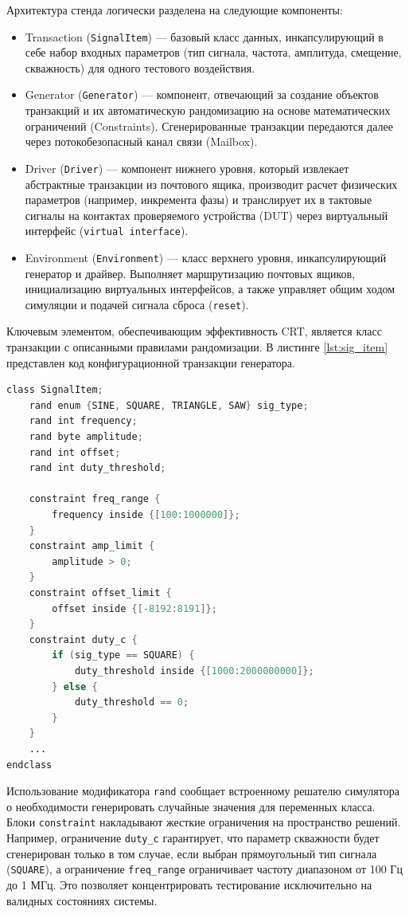 \documentclass[12pt,a4paper,TimesNewRoman]{article}
\begin{document}
Архитектура стенда логически разделена на следующие компоненты:
\begin{itemize}
    \item Transaction (\texttt{SignalItem}) — базовый класс данных, инкапсулирующий в себе набор входных параметров (тип сигнала, частота, амплитуда, смещение, скважность) для одного тестового воздействия.
    \item Generator (\texttt{Generator}) — компонент, отвечающий за создание объектов транзакций и их автоматическую рандомизацию на основе математических ограничений (Constraints). Сгенерированные транзакции передаются далее через потокобезопасный канал связи (Mailbox).
    \item Driver (\texttt{Driver}) — компонент нижнего уровня, который извлекает абстрактные транзакции из почтового ящика, производит расчет физических параметров (например, инкремента фазы) и транслирует их в тактовые сигналы на контактах проверяемого устройства (DUT) через виртуальный интерфейс (\texttt{virtual interface}).
    \item Environment (\texttt{Environment}) — класс верхнего уровня, инкапсулирующий генератор и драйвер. Выполняет маршрутизацию почтовых ящиков, инициализацию виртуальных интерфейсов, а также управляет общим ходом симуляции и подачей сигнала сброса (\texttt{reset}).
\end{itemize}

Ключевым элементом, обеспечивающим эффективность CRT, является класс транзакции с описанными правилами рандомизации. В листинге \ref{lst:sig_item} представлен код конфигурационной транзакции генератора.

\begin{lstlisting}[language=Verilog, caption={Класс транзакции с ограничениями рандомизации}, label={lst:sig_item}]
class SignalItem;
    rand enum {SINE, SQUARE, TRIANGLE, SAW} sig_type;
    rand int frequency;
    rand byte amplitude;
    rand int offset;
    rand int duty_threshold;

    constraint freq_range {
        frequency inside {[100:1000000]};
    }
    constraint amp_limit {
        amplitude > 0;
    }
    constraint offset_limit {
        offset inside {[-8192:8191]};
    }
    constraint duty_c {
        if (sig_type == SQUARE) {
            duty_threshold inside {[1000:2000000000]};
        } else {
            duty_threshold == 0;
        } 
    }
    ...
endclass
\end{lstlisting}

Использование модификатора \texttt{rand} сообщает встроенному решателю симулятора о необходимости генерировать случайные значения для переменных класса. Блоки \texttt{constraint} накладывают жесткие ограничения на пространство решений. Например, ограничение \texttt{duty\_c} гарантирует, что параметр скважности будет сгенерирован только в том случае, если выбран прямоугольный тип сигнала (\texttt{SQUARE}), а ограничение \texttt{freq\_range} ограничивает частоту диапазоном от 100 Гц до 1 МГц. Это позволяет концентрировать тестирование исключительно на валидных состояниях системы.
\end{document}
